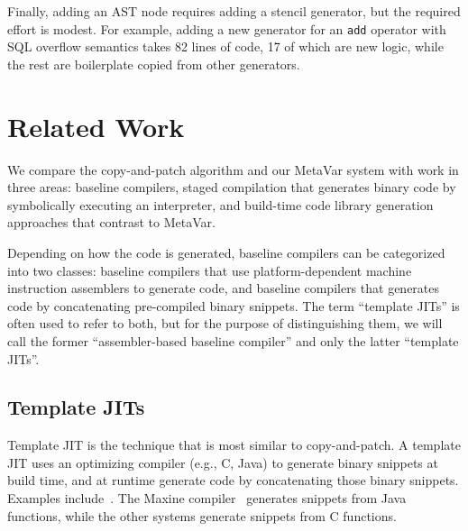 \documentclass[acmsmall,nonacm,screen]{acmart}\settopmatter{printfolios=true,printccs=true,printacmref=false}
\newcommand{\cp}{copy-and-patch}
\begin{document}
Finally, adding an AST node requires adding a stencil generator, but the required effort is modest. For example, adding a new generator for an \texttt{add} operator with SQL overflow semantics takes 82 lines of code, 17 of which are new logic, while the rest are boilerplate copied from other generators.




\section{Related Work}
\label{sec:related-work}

We compare the \cp{} algorithm and our MetaVar system with work in three areas:  baseline compilers, staged compilation that generates binary code by symbolically executing an interpreter, and build-time code library generation approaches that contrast to MetaVar.

Depending on how the code is generated, baseline compilers can be categorized into two classes: baseline compilers that use platform-dependent machine instruction assemblers to generate code, and baseline compilers that generates code by concatenating pre-compiled binary snippets. The term ``template JITs'' is often used to refer to both, but for the purpose of distinguishing them, we will call the former ``assembler-based baseline compiler'' and only the latter ``template JITs''.

\subsection*{Template JITs}

Template JIT is the technique that is most similar to \cp{}. A template JIT uses an optimizing compiler (e.g., C, Java) to generate binary snippets at build time, and at runtime generate code by concatenating those binary snippets. Examples include~\cite{maxine2013, templateJit2003, piumarta1998, ertl2003}. The Maxine compiler~\cite{maxine2013} generates snippets from Java functions, while the other systems generate snippets from C functions. 
\end{document}
